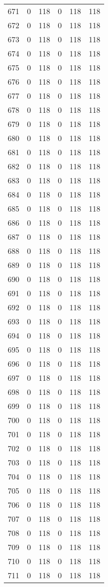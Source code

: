 \documentclass[a4paper]{ctexart}
\begin{document}
\begin{longtable}{p{1cm}|p{2cm}|p{2cm}|p{2cm}|P{2cm}|p{2cm}}
		671&0&118&0&118&118\\
		672&0&118&0&118&118\\
		673&0&118&0&118&118\\
		674&0&118&0&118&118\\
		675&0&118&0&118&118\\
		676&0&118&0&118&118\\
		677&0&118&0&118&118\\
		678&0&118&0&118&118\\
		679&0&118&0&118&118\\
		680&0&118&0&118&118\\
		681&0&118&0&118&118\\
		682&0&118&0&118&118\\
		683&0&118&0&118&118\\
		684&0&118&0&118&118\\
		685&0&118&0&118&118\\
		686&0&118&0&118&118\\
		687&0&118&0&118&118\\
		688&0&118&0&118&118\\
		689&0&118&0&118&118\\
		690&0&118&0&118&118\\
		691&0&118&0&118&118\\
		692&0&118&0&118&118\\
		693&0&118&0&118&118\\
		694&0&118&0&118&118\\
		695&0&118&0&118&118\\
		696&0&118&0&118&118\\
		697&0&118&0&118&118\\
		698&0&118&0&118&118\\
		699&0&118&0&118&118\\
		700&0&118&0&118&118\\
		701&0&118&0&118&118\\
		702&0&118&0&118&118\\
		703&0&118&0&118&118\\
		704&0&118&0&118&118\\
		705&0&118&0&118&118\\
		706&0&118&0&118&118\\
		707&0&118&0&118&118\\
		708&0&118&0&118&118\\
		709&0&118&0&118&118\\
		710&0&118&0&118&118\\
		711&0&118&0&118&118\\

\end{longtable}
\end{document}

